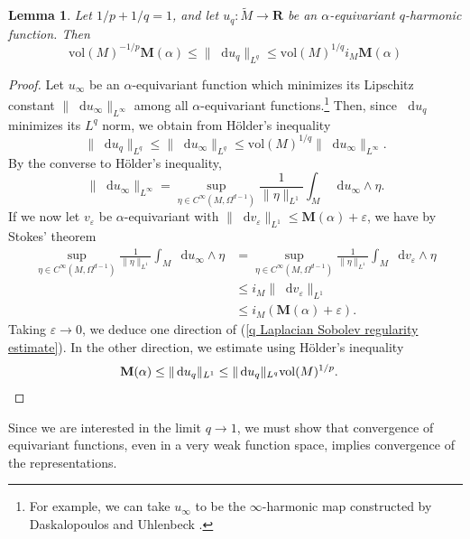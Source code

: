 \documentclass[reqno,11pt]{amsart}
\newcommand{\RR}{\mathbf{R}}
\newcommand*\dif{\mathop{}\!\mathrm{d}}
\newcommand{\vol}{\mathrm{vol}}
\newcommand{\Mass}{\mathbf M}
\newtheorem{lemma}[theorem]{Lemma}
\theoremstyle{definition}
\numberwithin{equation}{section}
\begin{document}
\begin{lemma}
Let $1/p + 1/q = 1$, and let $u_q: \tilde M \to \RR$ be an $\alpha$-equivariant $q$-harmonic function.
Then
\begin{equation}\label{q Laplacian Sobolev regularity estimate}
\vol(M)^{-1/p} \Mass(\alpha) \leq \|\dif u_q\|_{L^q} \leq \vol(M)^{1/q} i_M \Mass(\alpha)
\end{equation}
\end{lemma}
\begin{proof}
Let $u_\infty$ be an $\alpha$-equivariant function which minimizes its Lipschitz constant $\|\dif u_\infty\|_{L^\infty}$ among all $\alpha$-equivariant functions.\footnote{For example, we can take $u_\infty$ to be the $\infty$-harmonic map constructed by Daskalopoulos and Uhlenbeck \cite[\S2]{daskalopoulos2020transverse}.}
Then, since $\dif u_q$ minimizes its $L^q$ norm, we obtain from H\"older's inequality
$$\|\dif u_q\|_{L^q} \leq \|\dif u_\infty\|_{L^q} \leq \vol(M)^{1/q} \|\dif u_\infty\|_{L^\infty}.$$
By the converse to H\"older's inequality, 
$$\|\dif u_\infty\|_{L^\infty} = \sup_{\eta \in C^\infty(M, \Omega^{d - 1})} \frac{1}{\|\eta\|_{L^1}} \int_M \dif u_\infty \wedge \eta.$$
If we now let $v_\varepsilon$ be $\alpha$-equivariant with $\|\dif v_\varepsilon\|_{L^1} \leq \Mass(\alpha) + \varepsilon$, we have by Stokes' theorem
\begin{align*}
\sup_{\eta \in C^\infty(M, \Omega^{d - 1})} \frac{1}{\|\eta\|_{L^1}} \int_M \dif u_\infty \wedge \eta 
&= \sup_{\eta \in C^\infty(M, \Omega^{d - 1})} \frac{1}{\|\eta\|_{L^1}} \int_M \dif v_\varepsilon \wedge \eta\\
&\leq i_M \|\dif v_\varepsilon\|_{L^1} \\
&\leq i_M(\Mass(\alpha) + \varepsilon).
\end{align*}
Taking $\varepsilon \to 0$, we deduce one direction of (\ref{q Laplacian Sobolev regularity estimate}).
In the other direction, we estimate using H\"older's inequality
\begin{align*}
\Mass(\alpha) &\leq \|\dif u_q\|_{L^1} \leq \|\dif u_q\|_{L^q} \vol(M)^{1/p}. \qedhere 
\end{align*}
\end{proof}

Since we are interested in the limit $q \to 1$, we must show that convergence of equivariant functions, even in a very weak function space, implies convergence of the representations.
\end{document}
